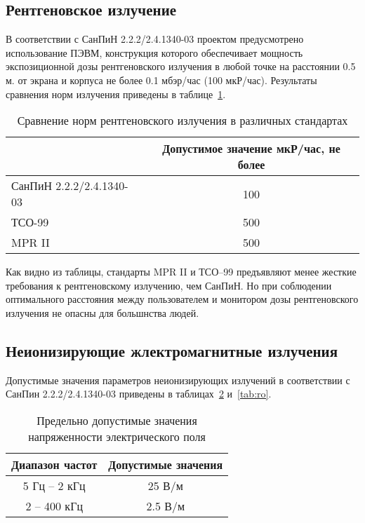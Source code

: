 \subsection{Рентгеновское излучение}

В соответствии с СанПиН 2.2.2/2.4.1340-03 проектом предусмотрено использование ПЭВМ, конструкция которого обеспечивает мощность экспозиционной дозы рентгеновского излучения в любой точке на расстоянии 0.5 м. от экрана и корпуса не более 0.1 мбэр/час (100 мкР/час). Результаты сравнения норм излучения приведены в таблице~\ref{tab:rentgen}.

\begin{table}[ht]
\caption{Сравнение норм рентгеновского излучения в различных стандартах}
\begin{tabular}{|l|c|}
\hline
& Допустимое значение мкР/час, не более \\
\hline
СанПиН 2.2.2/2.4.1340-03 & 100 \\
\hline
ТСО-99 & 500 \\
\hline
MPR II & 500\\
\hline
\end{tabular}
\label{tab:rentgen}
\end{table}

Как видно из таблицы, стандарты MPR II и ТСО--99 предъявляют менее жесткие требования к рентгеновскому излучению, чем СанПиН. Но при соблюдении оптимального расстояния между пользователем и монитором дозы рентгеновского излучения не опасны для большнства людей.

\subsection{Неионизирующие жлектромагнитные излучения}

Допустимые значения параметров неионизирующих излучений в соответствии с СанПин 2.2.2/2.4.1340-03 приведены в таблицах~\ref{tab:U} и~\ref{tab:ro}.

\begin{table}[ht]
\caption{Предельно допустимые значения напряженности электрического поля}
\begin{tabular}{|c|c|}
\hline
Диапазон частот& Допустимые значения \\
\hline
5 Гц -- 2 кГц & 25 В/м \\
\hline
2 -- 400 кГц& 2.5 В/м \\
\hline
\end{tabular}
\label{tab:U}
\end{table}

